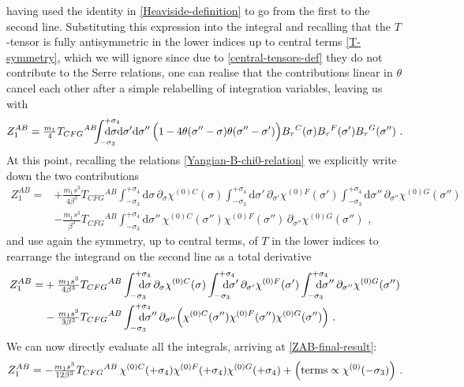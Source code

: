 \documentclass[12pt]{article}
\numberwithin{equation}{section}
\begin{document}
having used the identity in \eqref{Heaviside-definition} to go from the first to the second line. Substituting this expression into the integral and recalling that the $T$-tensor is fully antisymmetric in the lower indices up to central terms \eqref{T-symmetry}, which we will ignore since due to \eqref{central-tensors-def} they do not contribute to the Serre relations, one can realise that the contributions linear in $\theta$ cancel each other after a simple relabelling of integration variables, leaving us with
\begin{equation}
Z_{1}^{AB}=\tfrac{m_{1}}{4}T_{CFG}{}^{AB}\!\!\!\int_{-\sigma_{3}}^{+\sigma_{4}}\!\!\!\!\!\!\!\!\!\!\mathrm{d}\sigma\mathrm{d}\sigma' \mathrm{d}\sigma''  \, \Bigl( 1-4\theta(\sigma''-\sigma)\theta(\sigma''-\sigma') \Bigr)B_{\tau}{}^{C}(\sigma)B_{\tau}{}^{F}(\sigma')B_{\tau}{}^{G}(\sigma'') \,\, .
\end{equation}
At this point, recalling the relations \eqref{Yangian-B-chi0-relation} we explicitly write down the two contributions
\begin{equation}
\begin{aligned}
Z_{1}^{AB}=&+\tfrac{m_{1}s^3}{4\beta^3}T_{CFG}{}^{AB} \int_{-\sigma_{3}}^{+\sigma_{4}}\!\!\!\!\!\!\!\!\mathrm{d}\sigma  \, \partial_{\sigma} \chi^{(0)C}(\sigma)\int_{-\sigma_{3}}^{+\sigma_{4}}\!\!\!\!\!\!\!\!\mathrm{d}\sigma'  \, \partial_{\sigma'} \chi^{(0)F}(\sigma')\int_{-\sigma_{3}}^{+\sigma_{4}}\!\!\!\!\!\!\!\!\mathrm{d}\sigma''  \, \partial_{\sigma''} \chi^{(0)G}(\sigma'') 
\\
&-\tfrac{m_{1}s^3}{\beta^3}T_{CFG}{}^{AB}\int_{-\sigma_{3}}^{+\sigma_{4}}\!\!\!\!\!\!\!\!\mathrm{d}\sigma'' \, \chi^{(0)C}(\sigma'')\chi^{(0)F}(\sigma'') \,\partial_{\sigma''}\chi^{(0)G}(\sigma'') \,\, ,
\end{aligned}
\end{equation}
and use again the symmetry, up to central terms, of $T$ in the lower indices to rearrange the integrand on the second line as a total derivative
\begin{equation}
\begin{aligned}
Z_{1}^{AB}=&+\tfrac{m_{1}s^3}{4\beta^3}T_{CFG}{}^{AB} \int_{-\sigma_{3}}^{+\sigma_{4}}\!\!\!\!\!\!\!\!\mathrm{d}\sigma  \, \partial_{\sigma} \chi^{(0)C}(\sigma)\int_{-\sigma_{3}}^{+\sigma_{4}}\!\!\!\!\!\!\!\!\mathrm{d}\sigma'  \, \partial_{\sigma'} \chi^{(0)F}(\sigma')\int_{-\sigma_{3}}^{+\sigma_{4}}\!\!\!\!\!\!\!\!\mathrm{d}\sigma''  \, \partial_{\sigma''} \chi^{(0)G}(\sigma'')
\\
&-\tfrac{m_{1}s^3}{3\beta^3}T_{CFG}{}^{AB}\int_{-\sigma_{3}}^{+\sigma_{4}}\!\!\!\!\!\!\!\!\mathrm{d}\sigma'' \, \partial_{\sigma''}\Bigl( \chi^{(0)C}(\sigma'')\chi^{(0)F}(\sigma'') \chi^{(0)G}(\sigma'') \Bigr) \,\, .
\end{aligned}
\end{equation}
We can now directly evaluate all the integrals, arriving at \eqref{ZAB-final-result}:
\begin{equation}
Z_{1}^{AB}=-\tfrac{m_{1}s^3}{12\beta^3}T_{CFG}{}^{AB} \, \chi^{(0)C}(+\sigma_{4}) \chi^{(0)F}(+\sigma_{4}) \chi^{(0)G}(+\sigma_{4}) +\Bigl(\text{terms}\propto\chi^{(0)}(-\sigma_{3})\Bigr) \,\, .
\end{equation}
\end{document}
